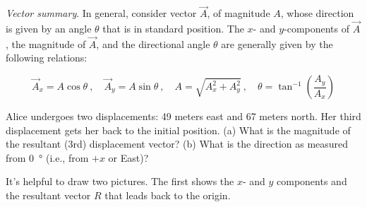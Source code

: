 \documentclass[main-physics.tex]{subfiles}
\begin{document}
\begin{mdframed}[backgroundcolor=black!10]
\textit{Vector summary}. In general, consider vector $\vec{A}$, of magnitude $A$, whose direction is given by an angle $\theta$ that is in standard position. The $x$- and $y$-components of $\vec{A}$, the magnitude of $\vec{A}$, and the directional angle $\theta$ are generally given by the following relations: 

\begin{equation*}
    \vec{A}_x = A \cos{\theta}\ , \hspace{1em}
    \vec{A}_y = A \sin{\theta}\ , \hspace{1em}
    A = \sqrt{A_x^2 + A_y^2}\ , \hspace{1em}
    \theta = \tan^{-1}\left(\frac{A_y}{A_x}\right)
\end{equation*}
\end{mdframed}

\begin{figure}[h!]
    \centering
    \pgfplotsset{compat=1.11}
    \def\A{6}
    \def\angle{55}
\end{figure}

\begin{example}
    Alice undergoes two displacements: 49 meters east and 67 meters north. Her third displacement gets her back to the initial position. (a) What is the magnitude of the resultant (3rd) displacement vector? (b) What is the direction as measured from \SI{0}{\degree} (i.e., from $+x$ or East)?
\end{example}

\Solution It's helpful to draw two pictures. The first shows the $x$- and $y$ components and the resultant vector $R$ that leads back to the origin.
\end{document}
